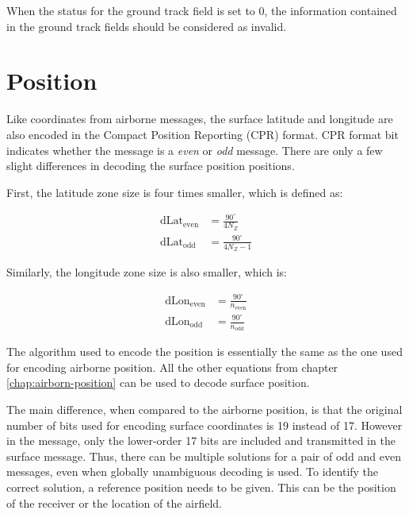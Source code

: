 When the status for the ground track field is set to 0, the information contained in the ground track fields should be considered as invalid.

\section{Position}

Like coordinates from airborne messages, the surface latitude and longitude are also encoded in the Compact Position Reporting (CPR) format. CPR format bit indicates whether the message is a \emph{even} or \emph{odd} message. There are only a few slight differences in decoding the surface position positions. 

First, the latitude zone size is four times smaller, which is defined as:

\begin{equation}
\begin{split}
    \mathrm{dLat}_\mathrm{even} &= \frac{90^\circ}{4 N_Z} \\
    \mathrm{dLat}_\mathrm{odd} &= \frac{90^\circ}{4 N_Z - 1}
\end{split}
\end{equation}

Similarly, the longitude zone size is also smaller, which is:

\begin{equation}
\begin{split}
    \mathrm{dLon}_\mathrm{even} &= \frac{90^\circ}{n_\mathrm{even}} \\
    \mathrm{dLon}_\mathrm{odd} &= \frac{90^\circ}{n_\mathrm{odd}}
\end{split}
\end{equation}

The algorithm used to encode the position is essentially the same as the one used for encoding airborne position. All the other equations from chapter \ref{chap:airborn-position} can be used to decode surface position.

The main difference, when compared to the airborne position, is that the original number of bits used for encoding surface coordinates is 19 instead of 17. However in the message, only the lower-order 17 bits are included and transmitted in the surface message. Thus, there can be multiple solutions for a pair of odd and even messages, even when globally unambiguous decoding is used. To identify the correct solution, a reference position needs to be given. This can be the position of the receiver or the location of the airfield.


